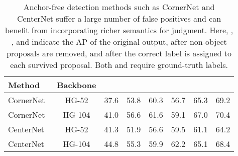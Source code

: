 \documentclass[runningheads]{llncs}
\begin{document}
\begin{table}[!t]
\begin{center}
\caption{Comparison among the average recall (AR) of anchor-based and anchor-free detection methods. Here, the average recall is recorded for targets of different aspect ratios and different sizes. To explore the limit of the average recall for each method, we exclude the impacts of bounding-box categories and sorts on recall, and compute it by allowing at most  object proposals. , ,  and  denote box area in the ranges of , , , and , respectively. `X' and `HG' stand for ResNeXt and Hourglass, respectively.}
\label{tab:false_negatives}
\end{center}
\vspace{-5ex}
\end{table}

\begin{table}[!b]
\begin{center}
\vspace{-3ex}
\caption{Anchor-free detection methods such as CornerNet and CenterNet suffer a large number of false positives and can benefit from incorporating richer semantics for judgment. Here, , , and  indicate the AP of the original output, after non-object proposals are removed, and after the correct label is assigned to each survived proposal. Both  and  require ground-truth labels.}
\label{tab:false_positives}
\begin{tabular}{|l|c|ccc|ccc|}
\hline
Method & Backbone &  &  &  &  &  &  \\
\hline\hline
CornerNet~\cite{law2018cornernet}  & HG-52 & 37.6 & 53.8 & 60.3 & 56.7 & 65.3 & 69.2 \\
CornerNet~\cite{law2018cornernet}  & HG-104 & 41.0 & 56.6 & 61.6 & 59.1 & 67.0 & 70.4 \\
\hline
CenterNet~\cite{duan2019centernet} & HG-52 & 41.3 & 51.9 & 56.6 & 59.5 & 61.1 & 64.2 \\
CenterNet~\cite{duan2019centernet} & HG-104 & 44.8 & 55.3 & 59.9 & 62.2 & 65.1 & 68.4 \\
\hline
\end{tabular}
\end{center}
\end{table}
\end{document}
